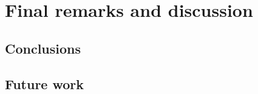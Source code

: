 \chapter{Final remarks and discussion}
\label{chap:final}

\section{Conclusions}

\section{Future work}